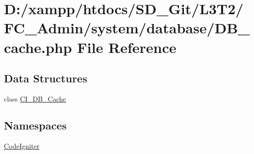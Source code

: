 \hypertarget{_d_b__cache_8php}{}\section{D\+:/xampp/htdocs/\+S\+D\+\_\+\+Git/\+L3\+T2/\+F\+C\+\_\+\+Admin/system/database/\+D\+B\+\_\+cache.php File Reference}
\label{_d_b__cache_8php}
\subsection*{Data Structures}
\begin{DoxyCompactItemize}
\item 
class \hyperlink{class_c_i___d_b___cache}{C\+I\+\_\+\+D\+B\+\_\+\+Cache}
\end{DoxyCompactItemize}
\subsection*{Namespaces}
\begin{DoxyCompactItemize}
\item 
 \hyperlink{namespace_code_igniter}{Code\+Igniter}
\end{DoxyCompactItemize}
